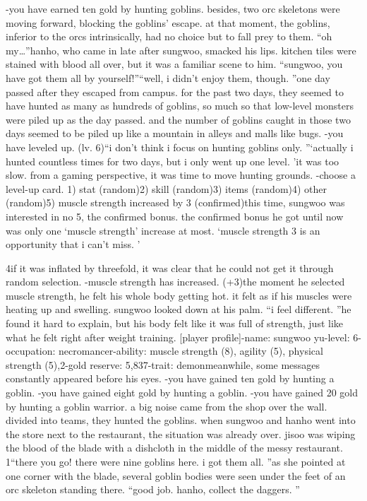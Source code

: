 -you have earned ten gold by hunting goblins.
besides, two orc skeletons were moving forward, blocking the goblins’ escape.
 at that moment, the goblins, inferior to the orcs intrinsically, had no choice but to fall prey to them.
“oh my…”hanho, who came in late after sungwoo, smacked his lips.
 kitchen tiles were stained with blood all over, but it was a familiar scene to him.
“sungwoo, you have got them all by yourself!”“well, i didn’t enjoy them, though.
”one day passed after they escaped from campus.
 for the past two days, they seemed to have hunted as many as hundreds of goblins, so much so that low-level monsters were piled up as the day passed.
 and the number of goblins caught in those two days seemed to be piled up like a mountain in alleys and malls like bugs.
-you have leveled up.
 (lv.
 6)“i don’t think i focus on hunting goblins only.
”‘actually i hunted countless times for two days, but i only went up one level.
’it was too slow.
 from a gaming perspective, it was time to move hunting grounds.
-choose a level-up card.
1) stat (random)2) skill (random)3) items (random)4) other (random)5) muscle strength increased by 3 (confirmed)this time, sungwoo was interested in no 5, the confirmed bonus.
the confirmed bonus he got until now was only one ‘muscle strength’ increase at most.
‘muscle strength 3 is an opportunity that i can’t miss.
’

4if it was inflated by threefold, it was clear that he could not get it through random selection.
-muscle strength has increased.
 (+3)the moment he selected muscle strength, he felt his whole body getting hot.
it felt as if his muscles were heating up and swelling.
 sungwoo looked down at his palm.
“i feel different.
”he found it hard to explain, but his body felt like it was full of strength, just like what he felt right after weight training.
[player profile]-name: sungwoo yu-level: 6-occupation: necromancer-ability: muscle strength (8), agility (5), physical strength (5),2-gold reserve: 5,837-trait: demonmeanwhile, some messages constantly appeared before his eyes.
-you have gained ten gold by hunting a goblin.
-you have gained eight gold by hunting a goblin.
-you have gained 20 gold by hunting a goblin warrior.
a big noise came from the shop over the wall.
 divided into teams, they hunted the goblins.
when sungwoo and hanho went into the store next to the restaurant, the situation was already over.
 jisoo was wiping the blood of the blade with a dishcloth in the middle of the messy restaurant.
1“there you go! there were nine goblins here.
 i got them all.
”as she pointed at one corner with the blade, several goblin bodies were seen under the feet of an orc skeleton standing there.
“good job.
 hanho, collect the daggers.
”

 